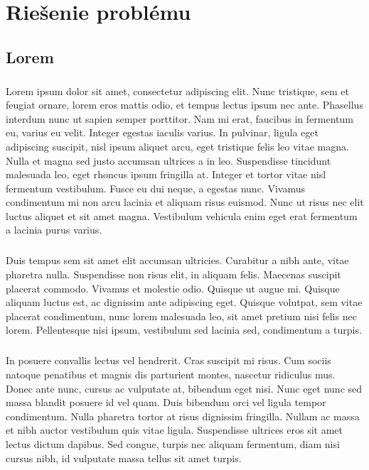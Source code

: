 \chapter{Riešenie problému}
\section{Lorem}
\paragraph{}
Lorem ipsum dolor sit amet, consectetur adipiscing elit. Nunc tristique, sem et feugiat ornare, lorem eros mattis odio, et tempus lectus ipsum nec ante. Phasellus interdum nunc ut sapien semper porttitor. Nam mi erat, faucibus in fermentum eu, varius eu velit. Integer egestas iaculis varius. In pulvinar, ligula eget adipiscing suscipit, nisl ipsum aliquet arcu, eget tristique felis leo vitae magna. Nulla et magna sed justo accumsan ultrices a in leo. Suspendisse tincidunt malesuada leo, eget rhoncus ipsum fringilla at. Integer et tortor vitae nisl fermentum vestibulum. Fusce eu dui neque, a egestas nunc. Vivamus condimentum mi non arcu lacinia et aliquam risus euismod. Nunc ut risus nec elit luctus aliquet et sit amet magna. Vestibulum vehicula enim eget erat fermentum a lacinia purus varius.

\paragraph{}
Duis tempus sem sit amet elit accumsan ultricies. Curabitur a nibh ante, vitae pharetra nulla. Suspendisse non risus elit, in aliquam felis. Maecenas suscipit placerat commodo. Vivamus et molestie odio. Quisque ut augue mi. Quisque aliquam luctus est, ac dignissim ante adipiscing eget. Quisque volutpat, sem vitae placerat condimentum, nunc lorem malesuada leo, sit amet pretium nisi felis nec lorem. Pellentesque nisi ipsum, vestibulum sed lacinia sed, condimentum a turpis.

\paragraph{}
In posuere convallis lectus vel hendrerit. Cras suscipit mi risus. Cum sociis natoque penatibus et magnis dis parturient montes, nascetur ridiculus mus. Donec ante nunc, cursus ac vulputate at, bibendum eget nisi. Nunc eget nunc sed massa blandit posuere id vel quam. Duis bibendum orci vel ligula tempor condimentum. Nulla pharetra tortor at risus dignissim fringilla. Nullam ac massa et nibh auctor vestibulum quis vitae ligula. Suspendisse ultrices eros sit amet lectus dictum dapibus. Sed congue, turpis nec aliquam fermentum, diam nisi cursus nibh, id vulputate massa tellus sit amet turpis.


